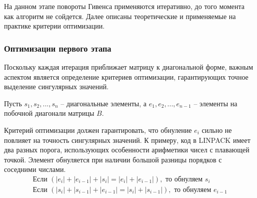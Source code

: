 На данном этапе повороты Гивенса применяются итеративно, до того момента как алгоритм не сойдется. Далее описаны теоретические и применяемые на практике критерии оптимизации.

\subsubsection{Оптимизации первого этапа}

 Поскольку каждая итерация приближает матрицу к диагональной форме, важным аспектом является определение критериев оптимизации, гарантирующих точное выделение сингулярных значений.


Пусть $s_1, s_2,...,s_n$ \--- диагональные элементы, а $e_1, e_2, ..., e_{n-1}$ \--- элементы на побочной диагонали матрицы $B$. 

Критерий оптимизации должен гарантировать, что обнуление $e_i$ сильно не повлияет на точность сингулярных значений. К примеру, код в LINPACK \cite{Dongarra1979} имеет два разных порога, использующих особенности арифметики чисел с плавающей точкой. Элемент обнуляется при наличии большой разницы порядков с соседними числами.
\begin{align}
\text{Если } (|e_i| + |e_{i-1}| + |s_i| = |e_i| + |e_{i-1}|), \text{ то обнуляем }s_i \label{eq:1:1:1}
\\\text{Если } (|s_i| + |s_{i-1}| + |e_{i-1}| = |s_i| + |s_{i-1}|), \text{ то обнуляем }e_{i-1} \label{eq:1:1:2}
\end{align}

